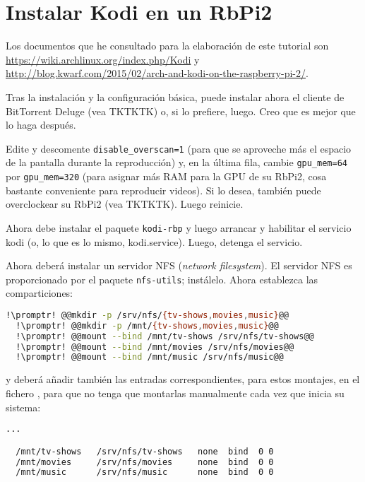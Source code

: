 \section{Instalar Kodi en un RbPi2}\label{sec:rasp-arch-kodi}
Los documentos que he consultado para la elaboración de este tutorial son
\url{https://wiki.archlinux.org/index.php/Kodi} y
\url{http://blog.kwarf.com/2015/02/arch-and-kodi-on-the-raspberry-pi-2/}.

Tras la instalación y la configuración básica, puede instalar ahora el cliente de BitTorrent Deluge (vea TKTKTK)
o, si lo prefiere, luego. Creo que es mejor que lo haga después.

Edite  y descomente \lstinline+disable_overscan=1+ (para que se aproveche más el espacio
de la pantalla durante la reproducción) y, en la última fila, cambie \lstinline+gpu_mem=64+ por
\lstinline+gpu_mem=320+ (para asignar más RAM para la GPU de su RbPi2, cosa bastante conveniente para reproducir
videos). Si lo desea, también puede overclockear su RbPi2 (vea TKTKTK). Luego reinicie.

Ahora debe instalar el paquete \lstinline+kodi-rbp+ y luego arrancar y habilitar el servicio kodi (o, lo que es
lo mismo, kodi.service). Luego, detenga el servicio.

Ahora deberá instalar un servidor NFS (\foreignlanguage{english}{\emph{network filesystem}}). El servidor NFS es
proporcionado por el paquete \lstinline+nfs-utils+; instálelo. Ahora establezca las comparticiones:

\begin{lstlisting}[gobble=2,language=bash,style=bashinteract,escapechar=!]
  !\promptr! @@mkdir -p /srv/nfs/{tv-shows,movies,music}@@
  !\promptr! @@mkdir -p /mnt/{tv-shows,movies,music}@@
  !\promptr! @@mount --bind /mnt/tv-shows /srv/nfs/tv-shows@@
  !\promptr! @@mount --bind /mnt/movies /srv/nfs/movies@@
  !\promptr! @@mount --bind /mnt/music /srv/nfs/music@@
\end{lstlisting}

\noindent y deberá añadir también las entradas correspondientes, para estos montajes, en el fichero
, para que no tenga que montarlas manualmente cada vez que inicia su sistema:

\begin{lstlisting}[gobble=2,language=bash,style=bashinteract,escapechar=!]
  ...

  /mnt/tv-shows   /srv/nfs/tv-shows   none  bind  0 0
  /mnt/movies     /srv/nfs/movies     none  bind  0 0
  /mnt/music      /srv/nfs/music      none  bind  0 0
\end{lstlisting}

